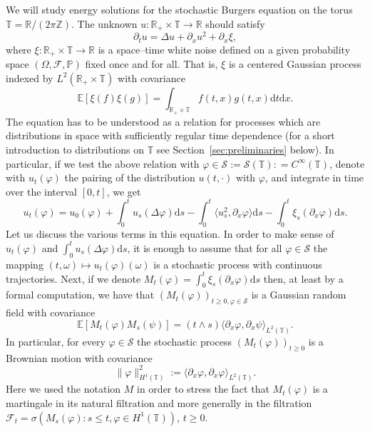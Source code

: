 \documentclass[a4paper,11pt]{article}
\newcommand{\assign}{:=}
\newcommand{\mathd}{\mathrm{d}}
\newcommand{\CS}{\mathscr{S}}
\begin{document}
We will study energy solutions for the stochastic Burgers equation on the
torus $\mathbb{T}=\mathbb{R}/ (2 \pi \mathbb{Z})$. The unknown $u :
\mathbb{R}_+ \times \mathbb{T} \rightarrow \mathbb{R}$ should satisfy
\[ \partial_t u = \Delta u + \partial_x u^2 + \partial_x \xi, \]
where $\xi : \mathbb{R}_+ \times \mathbb{T} \rightarrow \mathbb{R}$ is a
space--time white noise defined on a given probability space $(\Omega,
\mathcal{F}, \mathbb{P})$ fixed once and for all. That is, $\xi$ is a
centered Gaussian process indexed by $L^2 (\mathbb{R}_+ \times \mathbb{T})$
with covariance
\[ \mathbb{E} [\xi (f) \xi (g)] = \int_{\mathbb{R}_+ \times \mathbb{T}} f
   (t, x) g (t, x) \mathd t \mathd x. \]
The equation has to be understood as a relation for processes which are
distributions in space with sufficiently regular time dependence (for a short
introduction to distributions on $\mathbb{T}$ see
Section~\ref{sec:preliminaries} below). In particular, if we test the above
relation with $\varphi \in \CS \assign \CS (\mathbb{T}) : = C^{\infty}
(\mathbb{T})$, denote with $u_t (\varphi)$ the pairing of the distribution $u
(t, \cdot)$ with $\varphi$, and integrate in time over the interval $[0, t]$,
we get
\[ u_t (\varphi) = u_0 (\varphi) + \int_0^t u_s (\Delta \varphi) \mathd s -
   \int_0^t \langle u^2_s, \partial_x \varphi \rangle \mathd s - \int_0^t
   \xi_s (\partial_x \varphi) \mathd s. \]
Let us discuss the various terms in this equation. In order to make sense of
$u_t (\varphi)$ and $\int_0^t u_s (\Delta \varphi) \mathd s$, it is enough to
assume that for all $\varphi \in \CS$ the mapping $(t, \omega) \mapsto u_t
(\varphi) (\omega)$ is a stochastic process with continuous trajectories.
Next, if we denote $M_t (\varphi) = \int_0^t \xi_s (\partial_x \varphi) \mathd
s$ then, at least by a formal computation, we have that $(M_t (\varphi))_{t
\geqslant 0, \varphi \in \CS}$ is a Gaussian random field with covariance
\[ \mathbb{E} [M_t (\varphi) M_s (\psi)] = (t \wedge s) \langle \partial_x
   \varphi, \partial_x \psi \rangle_{L^2 (\mathbb{T})} . \]
In particular, for every $\varphi \in \CS$ the stochastic process $(M_t
(\varphi))_{t \geqslant 0}$ is a Brownian motion with covariance
\[ \| \varphi \|_{H^1 (\mathbb{T})}^2 \assign \langle \partial_x \varphi,
   \partial_x \varphi \rangle_{L^2 (\mathbb{T})} . \]
Here we used the notation $M$ in order to stress the fact that $M_t (\varphi)$
is a martingale in its natural filtration and more generally in the filtration
$\mathcal{F}_t = \sigma (M_s (\varphi) : s \leqslant t, \varphi \in H^1
(\mathbb{T}))$, $t \geqslant 0$.
\end{document}
